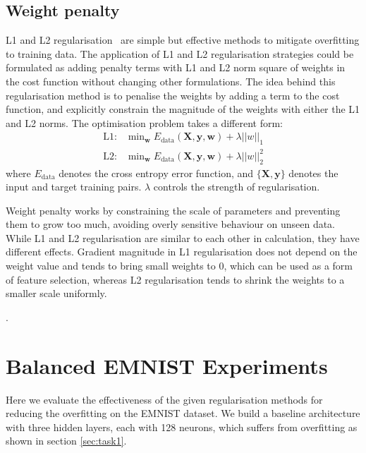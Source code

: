 \documentclass{article}
\begin{document}
\subsection{Weight penalty}

L1 and L2 regularisation~\cite{ng2004feature} are simple but effective methods to mitigate overfitting to training data. 
The application of L1 and L2 regularisation strategies could be formulated as adding penalty terms with L1 and L2 norm square of weights in the cost function without changing other formulations. 
The idea behind this regularisation method is to penalise the weights by adding a term to the cost function, and explicitly constrain the magnitude of the weights with either the L1 and L2 norms.
The optimisation problem takes a different form:
\begin{align}
    \text{L1: } & \text{min}_{\bm{w}} \; E_{\text{data}}(\bm{X}, \bm{y}, \bm{w}) + \lambda ||w||_1\\
    \text{L2: } & \text{min}_{\bm{w}} \; E_{\text{data}}(\bm{X}, \bm{y}, \bm{w}) + \lambda ||w||^2_2
\end{align}
where $E_{\text{data}}$ denotes the cross entropy error function, and $\{\bm{X}, \bm{y}\}$ denotes the input and target training pairs. 
$\lambda$ controls the strength of regularisation.

Weight penalty works by constraining the scale of parameters and preventing them to grow too much, avoiding overly sensitive behaviour on unseen data.
While L1 and L2 regularisation are similar to each other in calculation, they have different effects.
Gradient magnitude in L1 regularisation does not depend on the weight value and tends to bring small weights to 0, which can be used as a form of feature selection, whereas L2 regularisation tends to shrink the weights to a smaller scale uniformly. 

\questionTwelve.


\section{Balanced EMNIST Experiments}

\questionTableThree

\questionFigureFour

\label{sec:task2.2}

Here we evaluate the effectiveness of the given regularisation methods for reducing the overfitting on the EMNIST dataset.
We build a baseline architecture with three hidden layers, each with 128 neurons, which suffers from overfitting as shown in section \ref{sec:task1}.
\end{document}

